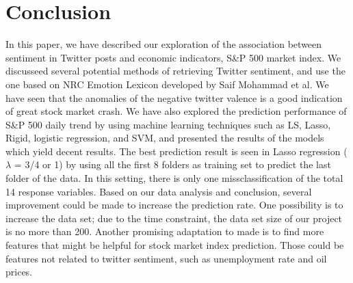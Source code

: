 \documentclass[10pt,letterpaper]{article}
\begin{document}
\section{Conclusion}
In this paper, we have described our exploration of the association between sentiment in Twitter posts and economic indicators, S\&P 500 market index. We discusseed several potential methods of retrieving Twitter sentiment, and use the one based on NRC Emotion Lexicon developed by Saif Mohammad et al. We have seen that the anomalies of the negative twitter valence is a good indication of great stock market crash. We have also explored the prediction performance of S\&P 500 daily trend by using machine learning techniques such as LS, Lasso, Rigid, logistic regression, and SVM, and presented the results of the models which yield decent results. The best prediction result is seen in Lasso regression ($\lambda$ = 3/4 or 1) by using all the first 8 folders as training set to predict the last folder of the data. In this setting, there is only one missclassification of the total 14 response variables. Based on our data analysis and conclusion, several improvement could be made to increase the prediction rate. One possibility is to increase the data set; due to the time constraint, the data set size of our project is no more than 200. Another promising adaptation to made is to find more features that might be helpful for stock market index prediction. Those could be features not related to twitter sentiment, such as unemployment rate and oil prices.  




\newpage


\end{document}
